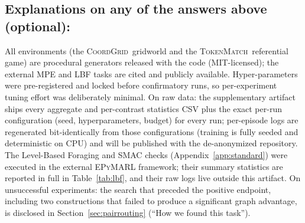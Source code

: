 \documentclass[10pt]{article}
\newcommand{\coordgrid}{\textsc{CoordGrid}}
\newcommand{\tokenmatch}{\textsc{TokenMatch}}
\begin{document}
\subsection*{Explanations on any of the answers above (optional):}
All environments (the \coordgrid\ gridworld and the \tokenmatch\ referential game) are
procedural generators released with the code (MIT-licensed); the external MPE and LBF
tasks are cited and publicly available. Hyper-parameters were pre-registered and locked
before confirmatory runs, so per-experiment tuning effort was deliberately minimal.
On raw data: the supplementary artifact ships every aggregate and per-contrast
statistics CSV plus the exact per-run configuration (seed, hyperparameters,
budget) for every run; per-episode logs are regenerated bit-identically from
those configurations (training is fully seeded and deterministic on CPU) and
will be published with the de-anonymized repository. The Level-Based Foraging
and SMAC checks (Appendix~\ref{app:standard}) were executed in the external
\textsc{EPyMARL} framework; their summary statistics are reported in full in
Table~\ref{tab:lbf}, and their raw logs live outside this artifact.
On unsuccessful experiments: the search that preceded the positive endpoint,
including two constructions that failed to produce a significant graph
advantage, is disclosed in Section~\ref{sec:pairrouting}
(``How we found this task'').
\end{document}
